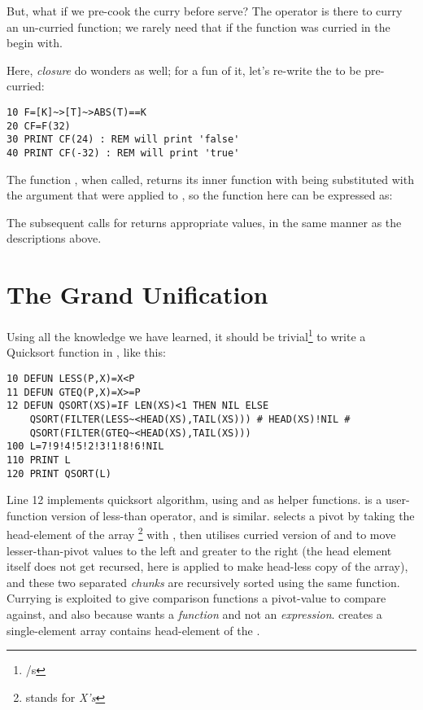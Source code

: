 But, what if we pre-cook the curry before serve? The \code{$\sim\!<$} operator is there to curry an un-curried function; we rarely need that if the function was curried in the begin with.

Here, \emph{closure} do wonders as well; for a fun of it, let's re-write the  to be pre-curried:

\begin{lstlisting}
10 F=[K]~>[T]~>ABS(T)==K
20 CF=F(32)
30 PRINT CF(24) : REM will print 'false'
40 PRINT CF(-32) : REM will print 'true'
\end{lstlisting}

The function , when called, returns its inner function  with  being substituted with the argument that were applied to , so the function  here can be expressed as: 

The subsequent calls for  returns appropriate values, in the same manner as the descriptions above.

\section[Wrapping-Up]{The Grand Unification}

Using all the knowledge we have learned, it should be trivial\footnote{/s} to write a Quicksort function in \tbas, like this:

\begin{lstlisting}
10 DEFUN LESS(P,X)=X<P
11 DEFUN GTEQ(P,X)=X>=P
12 DEFUN QSORT(XS)=IF LEN(XS)<1 THEN NIL ELSE 
    QSORT(FILTER(LESS~<HEAD(XS),TAIL(XS))) # HEAD(XS)!NIL # 
    QSORT(FILTER(GTEQ~<HEAD(XS),TAIL(XS)))
100 L=7!9!4!5!2!3!1!8!6!NIL
110 PRINT L
120 PRINT QSORT(L)
\end{lstlisting}

Line 12 implements quicksort algorithm, using  and  as helper functions.  is a user-function version of less-than operator, and  is similar.  selects a pivot by taking the head-element of the array \footnote{stands for \emph{X's}} with , then utilises curried version of  and  to move lesser-than-pivot values to the left and greater to the right (the head element itself does not get recursed, here  is applied to make head-less copy of the array), and these two separated \emph{chunks} are recursively sorted using the same  function. Currying is exploited to give comparison functions a pivot-value to compare against, and also because  wants a \emph{function} and not an \emph{expression}.  creates a single-element array contains head-element of the .

